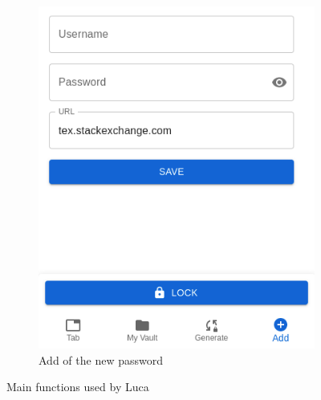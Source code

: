 \begin{enumerate}
\begin{figure}[H]
\begin{subfigure}{.5\textwidth}
			\includegraphics[width=.6\linewidth]{images/extension/add.png}
			\caption{Add of the new password}
			\label{fig:sub2}
		\end{subfigure}
		\caption{Main functions used by Luca}
		\label{fig:test}
	\end{figure}


\end{enumerate}
